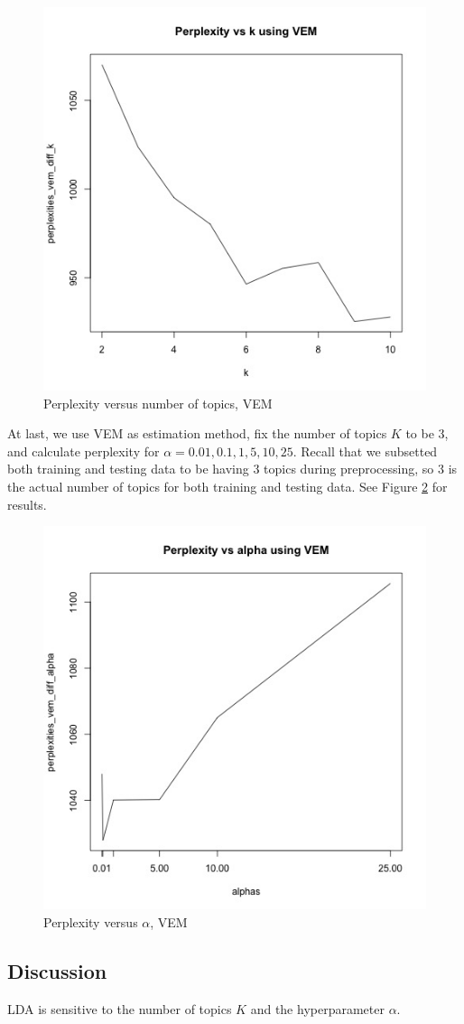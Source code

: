 \documentclass{article}
\begin{document}
\begin{figure}[h]
  \centering
  \includegraphics[width=0.5\linewidth]{images/vem_diff_k.jpg}
  \caption{Perplexity versus number of topics, VEM}
  \label{fig:vem_diff_k_10}
\end{figure}

At last, we use VEM as estimation method, fix the number of topics $K$ to be 3, and calculate perplexity for $\alpha = 0.01, 0.1, 1, 5, 10, 25$. Recall that we subsetted both training and testing data to be having 3 topics during preprocessing, so 3 is the actual number of topics for both training and testing data. See Figure \ref{fig:vem_diff_alpha} for results.

\begin{figure}[h]
  \centering
  \includegraphics[width=0.5\linewidth]{images/vem_diff_alpha.jpg}
  \caption{Perplexity versus $\alpha$, VEM}
  \label{fig:vem_diff_alpha}
\end{figure}


\subsection{Discussion}

LDA is sensitive to the number of topics $K$ and the hyperparameter $\alpha$.
\end{document}
